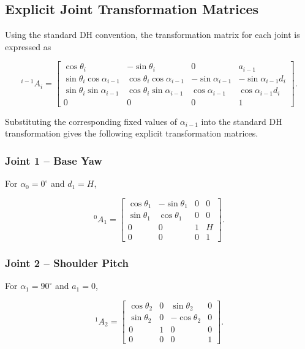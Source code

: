 \subsection{Explicit Joint Transformation Matrices}

Using the standard DH convention, the transformation matrix for each joint is expressed as

\begin{equation}
{}^{i-1}A_i =
\begin{bmatrix}
\cos\theta_i &
-\sin\theta_i &
0 &
a_{i-1}
\\
\sin\theta_i\cos\alpha_{i-1} &
\cos\theta_i\cos\alpha_{i-1} &
-\sin\alpha_{i-1} &
-\sin\alpha_{i-1}d_i
\\
\sin\theta_i\sin\alpha_{i-1} &
\cos\theta_i\sin\alpha_{i-1} &
\cos\alpha_{i-1} &
\cos\alpha_{i-1}d_i
\\
0 & 0 & 0 & 1
\end{bmatrix}.
\label{eq:dh_general}
\end{equation}

Substituting the corresponding fixed values of $\alpha_{i-1}$ into the standard DH transformation gives the following explicit transformation matrices.

\subsubsection{Joint 1 -- Base Yaw}

For $\alpha_0=0^\circ$ and $d_1=H$,

\begin{equation}
{}^0A_1 =
\begin{bmatrix}
\cos\theta_1 & -\sin\theta_1 & 0 & 0\\
\sin\theta_1 & \cos\theta_1 & 0 & 0\\
0 & 0 & 1 & H\\
0 & 0 & 0 & 1
\end{bmatrix}.
\label{eq:a1}
\end{equation}

\subsubsection{Joint 2 -- Shoulder Pitch}

For $\alpha_1=90^\circ$ and $a_1=0$,

\begin{equation}
{}^1A_2 =
\begin{bmatrix}
\cos\theta_2 & 0 & \sin\theta_2 & 0\\
\sin\theta_2 & 0 & -\cos\theta_2 & 0\\
0 & 1 & 0 & 0\\
0 & 0 & 0 & 1
\end{bmatrix}.
\label{eq:a2}
\end{equation}

